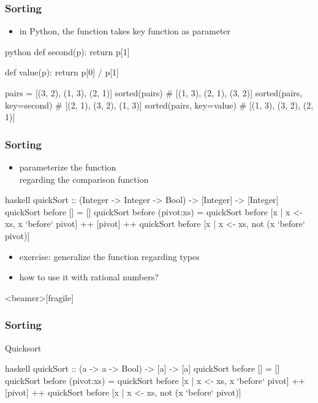 \documentclass[dvipsnames]{beamer}
\theoremstyle{plain}
\begin{document}
\begin{frame}[fragile]
  \frametitle{Sorting}

  \begin{itemize}
    \item in Python, the  function takes key function
      as parameter
  \end{itemize}

  \begin{exampleblock}{}
    \begin{pygments}{python}
def second(p):
    return p[1]

def value(p):
    return p[0] / p[1]

pairs = [(3, 2), (1, 3), (2, 1)]
sorted(pairs)              # [(1, 3), (2, 1), (3, 2)]
sorted(pairs, key=second)  # [(2, 1), (3, 2), (1, 3)]
sorted(pairs, key=value)   # [(1, 3), (3, 2), (2, 1)]
    \end{pygments}
  \end{exampleblock}
\end{frame}

\begin{frame}[fragile]
  \frametitle{Sorting}

  \begin{itemize}
    \item parameterize the  function\\
      regarding the comparison function
  \end{itemize}

  \begin{exampleblock}{}
    \begin{pygments}{haskell}
quickSort :: (Integer -> Integer -> Bool)
                 -> [Integer] -> [Integer]
quickSort before [] = []
quickSort before (pivot:xs) =
    quickSort before [x | x <- xs, x `before` pivot]
    ++ [pivot]
    ++ quickSort before [x | x <- xs,
                             not (x `before` pivot)]
    \end{pygments}
  \end{exampleblock}

  \pause
  \begin{itemize}
    \item exercise: generalize the function regarding types
    \item how to use it with rational numbers?
  \end{itemize}
\end{frame}

\begin{frame}<beamer>[fragile]
  \frametitle{Sorting}

  \begin{exampleblock}{Quicksort}
    \begin{pygments}{haskell}
quickSort :: (a -> a -> Bool) -> [a] -> [a]
quickSort before [] = []
quickSort before (pivot:xs) =
    quickSort before [x | x <- xs, x `before` pivot]
    ++ [pivot]
    ++ quickSort before [x | x <- xs,
                             not (x `before` pivot)]
    \end{pygments}
  \end{exampleblock}
\end{frame}
\end{document}
